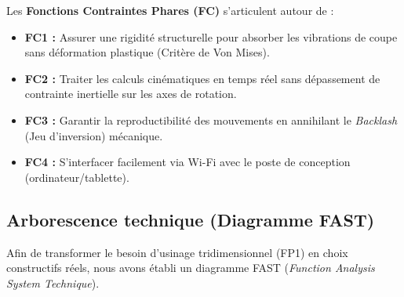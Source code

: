 Les \textbf{Fonctions Contraintes Phares (FC)} s'articulent autour de :
\begin{itemize}
    \item \textbf{FC1 :} Assurer une rigidité structurelle pour absorber les vibrations de coupe sans déformation plastique (Critère de Von Mises).
    \item \textbf{FC2 :} Traiter les calculs cinématiques en temps réel sans dépassement de contrainte inertielle sur les axes de rotation.
    \item \textbf{FC3 :} Garantir la reproductibilité des mouvements en annihilant le \textit{Backlash} (Jeu d'inversion) mécanique.
    \item \textbf{FC4 :} S'interfacer facilement via Wi-Fi avec le poste de conception (ordinateur/tablette).
\end{itemize}

\subsection{Arborescence technique (Diagramme FAST)}
Afin de transformer le besoin d'usinage tridimensionnel (FP1) en choix constructifs réels, nous avons établi un diagramme FAST (\textit{Function Analysis System Technique}).

